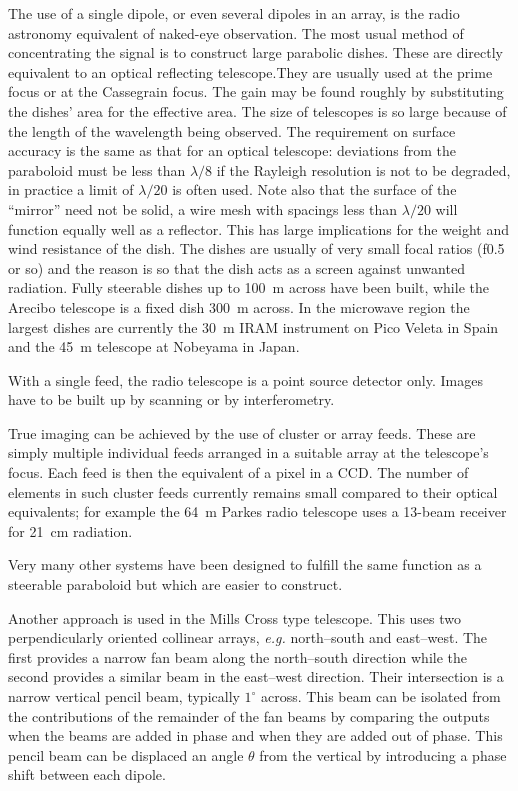 The use of a single dipole, or even several dipoles in an array, is the
radio astronomy equivalent of naked-eye observation. The most usual method
of concentrating the signal is to construct large parabolic dishes. These
are directly equivalent to an optical reflecting telescope.They are
usually used at the prime focus or at the Cassegrain focus. The gain may 
be found roughly by substituting the dishes' area for the effective area. 
The size of telescopes is so large because of the length of the wavelength
being observed. The requirement on surface accuracy is the same as that for
an optical telescope: deviations from the paraboloid must be less than 
$\lambda/8$ if the Rayleigh resolution is not to be degraded, in practice a
limit of $\lambda/20$ is often used. Note also that the surface of the 
``mirror'' need not be solid, a wire mesh with spacings less than $\lambda/20$
will function equally well as a reflector. This has large implications for the
weight and wind resistance of the dish. The dishes are usually of very 
small focal ratios (f0.5 or so) and the reason is so that the dish acts
as a screen against unwanted radiation. Fully steerable dishes up to 100~m
across have been built, while the Arecibo telescope is a fixed dish 300~m 
across. In the microwave region the largest dishes are currently the 30~m IRAM
instrument on Pico Veleta in Spain and the 45~m telescope at Nobeyama in Japan.

With a single feed, the radio telescope is a point source detector only. 
Images have to be built up by scanning or by interferometry. 

True imaging can be achieved by the use of cluster or array feeds. 
These are simply multiple individual feeds arranged in a suitable array at
the telescope's focus. Each feed is then the equivalent of a pixel in a CCD.
The number of elements in such cluster feeds currently remains small compared
to their optical equivalents; for example the 64~m Parkes radio telescope
uses a 13-beam receiver for 21~cm radiation. 

Very many other systems have been designed to fulfill the same function as
a steerable paraboloid but which are easier to construct. 

Another approach is used in the Mills Cross type telescope. This uses
two perpendicularly oriented collinear arrays, {\it e.g.} 
north--south and east--west. The first provides a
narrow fan beam along the north--south direction while the second provides a similar 
beam in the east--west direction. Their intersection is a narrow vertical pencil beam, 
typically $1^{\circ}$ across. This beam can be isolated from the contributions of the 
remainder of the fan beams by comparing the outputs when the beams are added 
in phase and when they are added out of phase. This pencil beam can be displaced
an angle $\theta$ from the vertical by introducing a phase shift between each dipole.

